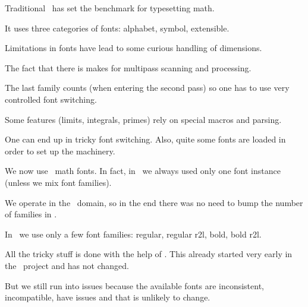 

\definecolor[maincolor] [r=.4]
\definecolor[extracolor][s=.1]

\startdocument
  [title={MATH},
   banner={complete control},
   location={context\enspace {\bf 2021}\enspace meeting}]

\starttitle[title=The benchmark]

\startitemize

\startitem
    Traditional \TEX\ has set the benchmark for typesetting math.
\stopitem

\startitem
    It uses three categories of fonts: alphabet, symbol, extensible.
\stopitem

\startitem
    Limitations in fonts have lead to some curious handling of dimensions.
\stopitem

\startitem
    The fact that there is \type {\over} makes for multipass scanning and
    processing.
\stopitem

\startitem
    The last family counts (when entering the second pass) so one has to use very
    controlled font switching.
\stopitem

\startitem
    Some features (limits, integrals, primes) rely on special macros and parsing.
\stopitem

\startitem
    One can end up in tricky font switching. Also, quite some fonts are loaded in
    order to set up the machinery.
\stopitem

\stopitemize

\stoptitle

\starttitle[title=Todays reality]

\startitemize

\startitem
    We now use \OPENTYPE\ math fonts. In fact, in \MKIV\ we always used only one
    font instance (unless we mix font families).
\stopitem

\startitem
    We operate in the \UNICODE\ domain, so in the end there was no need to bump the
    number of families in \LUATEX.
\stopitem

\startitem
    In \CONTEXT\ we use only a few font families: regular, regular r2l, bold, bold r2l.
\stopitem

\startitem
    All the tricky stuff is done with the help of \LUA. This already started very
    early in the \LUATEX\ project and has not changed.
\stopitem

\startitem
    But we still run into issues because the available fonts are inconsistent,
    incompatible, have issues and that is unlikely to change.
\stopitem

